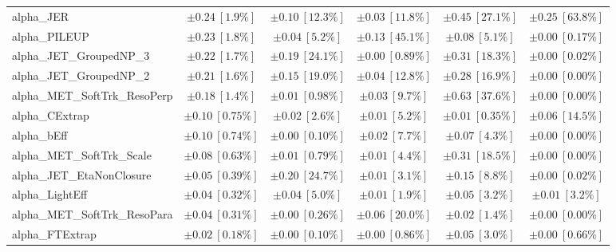 \begin{sidewaystable}
\begin{center}
\begin{tabular*}{\textwidth}{@{\extracolsep{\fill}}lccccc}
alpha\_JER         & $\pm 0.24\ [1.9\%] $          & $\pm 0.10\ [12.3\%] $          & $\pm 0.03\ [11.8\%] $          & $\pm 0.45\ [27.1\%] $          & $\pm 0.25\ [63.8\%] $       \\
alpha\_PILEUP         & $\pm 0.23\ [1.8\%] $          & $\pm 0.04\ [5.2\%] $          & $\pm 0.13\ [45.1\%] $          & $\pm 0.08\ [5.1\%] $          & $\pm 0.00\ [0.17\%] $       \\
alpha\_JET\_GroupedNP\_3         & $\pm 0.22\ [1.7\%] $          & $\pm 0.19\ [24.1\%] $          & $\pm 0.00\ [0.89\%] $          & $\pm 0.31\ [18.3\%] $          & $\pm 0.00\ [0.02\%] $       \\
alpha\_JET\_GroupedNP\_2         & $\pm 0.21\ [1.6\%] $          & $\pm 0.15\ [19.0\%] $          & $\pm 0.04\ [12.8\%] $          & $\pm 0.28\ [16.9\%] $          & $\pm 0.00\ [0.00\%] $       \\
alpha\_MET\_SoftTrk\_ResoPerp         & $\pm 0.18\ [1.4\%] $          & $\pm 0.01\ [0.98\%] $          & $\pm 0.03\ [9.7\%] $          & $\pm 0.63\ [37.6\%] $          & $\pm 0.00\ [0.00\%] $       \\
alpha\_CExtrap         & $\pm 0.10\ [0.75\%] $          & $\pm 0.02\ [2.6\%] $          & $\pm 0.01\ [5.2\%] $          & $\pm 0.01\ [0.35\%] $          & $\pm 0.06\ [14.5\%] $       \\
alpha\_bEff         & $\pm 0.10\ [0.74\%] $          & $\pm 0.00\ [0.10\%] $          & $\pm 0.02\ [7.7\%] $          & $\pm 0.07\ [4.3\%] $          & $\pm 0.00\ [0.00\%] $       \\
alpha\_MET\_SoftTrk\_Scale         & $\pm 0.08\ [0.63\%] $          & $\pm 0.01\ [0.79\%] $          & $\pm 0.01\ [4.4\%] $          & $\pm 0.31\ [18.5\%] $          & $\pm 0.00\ [0.00\%] $       \\
alpha\_JET\_EtaNonClosure         & $\pm 0.05\ [0.39\%] $          & $\pm 0.20\ [24.7\%] $          & $\pm 0.01\ [3.1\%] $          & $\pm 0.15\ [8.8\%] $          & $\pm 0.00\ [0.02\%] $       \\
alpha\_LightEff         & $\pm 0.04\ [0.32\%] $          & $\pm 0.04\ [5.0\%] $          & $\pm 0.01\ [1.9\%] $          & $\pm 0.05\ [3.2\%] $          & $\pm 0.01\ [3.2\%] $       \\
alpha\_MET\_SoftTrk\_ResoPara         & $\pm 0.04\ [0.31\%] $          & $\pm 0.00\ [0.26\%] $          & $\pm 0.06\ [20.0\%] $          & $\pm 0.02\ [1.4\%] $          & $\pm 0.00\ [0.00\%] $       \\
alpha\_FTExtrap         & $\pm 0.02\ [0.18\%] $          & $\pm 0.00\ [0.10\%] $          & $\pm 0.00\ [0.86\%] $          & $\pm 0.05\ [3.0\%] $          & $\pm 0.00\ [0.66\%] $       \\

\end{tabular*}
\end{center}
\end{sidewaystable}
